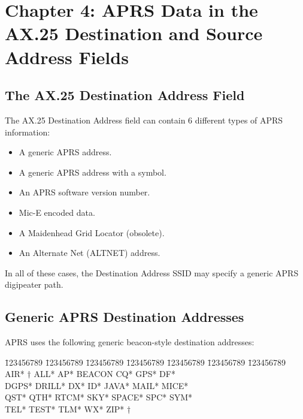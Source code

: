 \chapter{Chapter 4: APRS Data in the AX.25 Destination and Source Address Fields}


\section{The AX.25 Destination Address Field}

The AX.25 Destination Address field can contain 6 different types of APRS
information:

\begin{itemize}

\item A generic APRS address.

\item A generic APRS address with a symbol.

\item An APRS software version number.

\item Mic-E encoded data.

\item A Maidenhead Grid Locator (obsolete).

\item An Alternate Net (ALTNET) address.

\end{itemize}

In all of these cases, the Destination Address SSID may specify a generic
APRS digipeater path.

\section {Generic APRS Destination Addresses}

APRS uses the following generic beacon-style destination addresses:


\begin{tabbing}
\= 123456789 \=123456789 \=123456789 \=123456789 \=123456789 \=123456789 \=123456789 \kill
\> AIR* $\dagger$  \> ALL*   \> AP*   \> BEACON \> CQ*  \> GPS*   \> DF*   \\
\> DGPS*  \> DRILL* \> DX*   \> ID*    \> JAVA* \> MAIL* \> MICE* \\
\> QST*   \> QTH*   \> RTCM* \>SKY*    \> SPACE* \> SPC*  \> SYM* \\
\> TEL*   \> TEST*  \> TLM*  \> WX*    \> ZIP* $\dagger$ \\
\end{tabbing}

